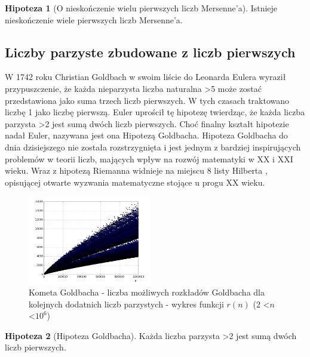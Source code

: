 \documentclass[10pt,onecolumn]{article}
\theoremstyle{definition}
\theoremstyle{hypothesis}
\newtheorem{hypothesis}{Hipoteza}
\theoremstyle{capability}
\begin{document}
\begin{hypothesis}[O nieskończenie wielu pierwszych liczb Mersenne'a]
Istnieje nieskończenie wiele pierwszych liczb Mersenne'a.
\label{Mers_prime_inf}
\end{hypothesis}

\subsection{Liczby parzyste zbudowane z liczb pierwszych}

W 1742 roku Christian Goldbach w swoim liście do Leonarda Eulera \cite{goldbach1742} wyraził przypuszczenie, że każda nieparzysta liczba naturalna \textgreater 5 może zostać przedstawiona jako suma trzech liczb pierwszych. W tych czasach traktowano liczbę 1 jako liczbę pierwszą. Euler uprościł tę hipotezę twierdząc, że każda liczba parzysta \textgreater 2 jest sumą dwóch liczb pierwszych. Choć finalny kształt hipotezie nadał Euler, nazywana jest ona Hipotezą Goldbacha. Hipoteza Goldbacha do dnia dzisiejszego nie została rozstrzygnięta i jest jednym z bardziej inspirujących problemów w teorii liczb, mających wpływ na rozwój matematyki w XX i XXI wieku. Wraz z hipotezą Riemanna widnieje na miejscu 8 listy Hilberta \cite{hilbert1900}, opisującej otwarte wyzwania matematyczne stojące u progu XX wieku.

\begin{figure}
  \begin{center}
    \includegraphics[width=0.48\textwidth]{f_goldbach_pairs}
  \end{center}
  \caption{Kometa Goldbacha - liczba możliwych rozkładów Goldbacha dla kolejnych dodatnich liczb parzystych - wykres funkcji $r(n)$ (2 \textless $n$ \textless $10^6$)}
  \label{fig:goldbach_pairs}
\end{figure}

\begin{hypothesis}[Hipoteza Goldbacha]
Każda liczba parzysta \textgreater 2 jest sumą dwóch liczb pierwszych.
\label{Goldbach_hyp}
\end{hypothesis}
\end{document}
